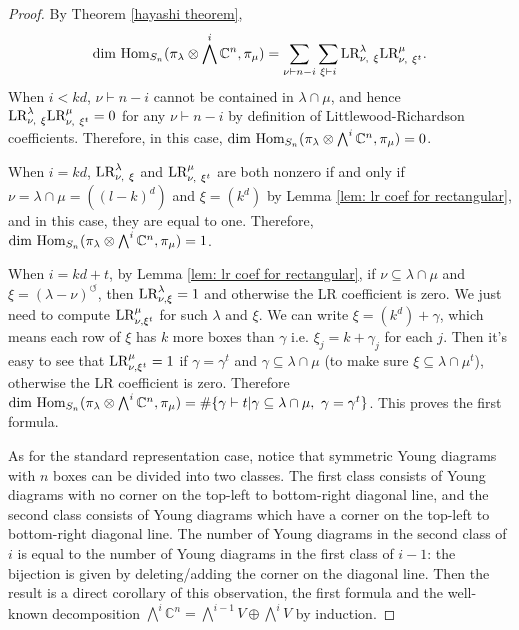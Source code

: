 \documentclass[11pt]{amsart}
\numberwithin{equation}{section}
\theoremstyle{definition}
\begin{document}
\begin{proof}
    By Theorem \ref{hayashi theorem}, 
    \begin{equation*}
        \textnormal{dim}\ \textnormal{Hom}_{S_{n}}(\pi_{\lambda}\otimes\bigwedge^{i}\mathbb{C}^{n}, \pi_{\mu})= \sum\limits_{\nu\vdash n-i}\sum\limits_{\xi\vdash i} \textnormal{LR}^{\lambda}_{\nu,\ \xi}\textnormal{LR}^{\mu}_{\nu,\ \xi^{t}}.
    \end{equation*}
    When $i<kd$, $\nu\vdash n-i$ cannot be contained in $\lambda\cap\mu$, and hence $\textnormal{LR}^{\lambda}_{\nu,\ \xi}\textnormal{LR}^{\mu}_{\nu,\ \xi^{t}}=0$ for any $\nu\vdash n-i$ by definition of Littlewood-Richardson coefficients. Therefore, in this case, $ \textnormal{dim}\ \textnormal{Hom}_{S_{n}}(\pi_{\lambda}\otimes\bigwedge^{i}\mathbb{C}^{n}, \pi_{\mu})=0$.

    When $i=kd$, $\textnormal{LR}^{\lambda}_{\nu,\ \xi}$ and $\textnormal{LR}^{\mu}_{\nu,\ \xi^{t}}$ are both nonzero if and only if  $\nu=\lambda\cap\mu=((l-k)^{d})$ and $\xi=(k^{d})$ by Lemma \ref{lem: lr coef for rectangular}, and in this case, they are equal to one. Therefore, $ \textnormal{dim}\ \textnormal{Hom}_{S_{n}}(\pi_{\lambda}\otimes\bigwedge^{i}\mathbb{C}^{n}, \pi_{\mu})=1$.

    When $i=kd+t$, by Lemma \ref{lem: lr coef for rectangular}, if $\nu\subseteq\lambda\cap\mu$ and $\xi=(\lambda-\nu)^{\circlearrowleft}$, then $\textnormal{LR}^{\lambda}_{\nu,\xi}=1$ and otherwise the LR coefficient is zero. We just need to compute $\textnormal{LR}^{\mu}_{\nu,\xi^{t}}$ for such $\lambda$ and $\xi$. We can write $\xi=(k^{d})+\gamma$, which means each row of $\xi$ has $k$ more boxes than $\gamma$ i.e. $\xi_{j}=k+\gamma_{j}$ for each $j$. Then it's easy to see that $\textnormal{LR}^{\mu}_{\nu,\xi^{t}}=1$ if $\gamma=\gamma^{t}$ and $\gamma\subseteq\lambda\cap\mu$ (to make sure $\xi\subseteq\lambda\cap\mu^{t}$), otherwise the LR coefficient is zero. Therefore   $\textnormal{dim}\ \textnormal{Hom}_{S_{n}}(\pi_{\lambda}\otimes\bigwedge^{i}\mathbb{C}^{n}, \pi_{\mu})=\#\{\gamma\vdash t|\gamma\subseteq\lambda\cap\mu,\ \gamma=\gamma^{t}\}$. This proves the first formula.
    
    As for the standard representation case, notice that symmetric Young diagrams with $n$ boxes can be divided into two classes. The first class consists of Young diagrams with no corner on the top-left to bottom-right diagonal line, and the second class consists of Young diagrams which have a corner on the top-left to bottom-right diagonal line. The number of Young diagrams in the second class of $i$ is equal to the number of Young diagrams in the first class of $i-1$: the bijection is given by deleting/adding the corner on the diagonal line. Then the result is a direct corollary of this observation, the first formula and the well-known decomposition $\bigwedge^{i}\mathbb{C}^{n}=\bigwedge^{i-1}V\oplus\bigwedge^{i}V$ by induction. 
\end{proof}
\end{document}
